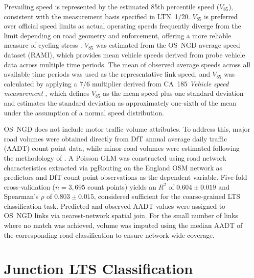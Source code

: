 Prevailing speed is represented by the estimated 85th percentile speed ($V_{85}$), consistent with the measurement basis specified in LTN~1/20. $V_{85}$ is preferred over official speed limits as actual operating speeds frequently diverge from the limit depending on road geometry and enforcement, offering a more reliable measure of cycling stress \parencite{fitzpatrick2003, europeancommission2021, departmentfortransport2025b}. $V_{85}$ was estimated from the OS~NGD average speed dataset (RAMI), which provides mean vehicle speeds derived from probe vehicle data across multiple time periods. The mean of observed average speeds across all available time periods was used as the representative link speed, and $V_{85}$ was calculated by applying a 7/6 multiplier derived from CA~185 \textit{Vehicle speed measurement} \parencite{nationalhighways2019}, which defines $V_{85}$ as the mean speed plus one standard deviation and estimates the standard deviation as approximately one-sixth of the mean under the assumption of a normal speed distribution.

OS~NGD does not include motor traffic volume attributes. To address this, major road volumes were obtained directly from DfT annual average daily traffic (AADT) count point data, while minor road volumes were estimated following the methodology of \parencite{morley2016}. A Poisson GLM was constructed using road network characteristics extracted via pgRouting on the England OSM network as predictors and DfT count point observations as the dependent variable. Five-fold cross-validation ($n = 3{,}695$ count points) yields an $R^2$ of $0.604 \pm 0.019$ and Spearman's $\rho$ of $0.803 \pm 0.015$, considered sufficient for the coarse-grained LTS classification task. Predicted and observed AADT values were assigned to OS~NGD links via nearest-network spatial join. For the small number of links where no match was achieved, volume was imputed using the median AADT of the corresponding road classification to ensure network-wide coverage.

\section{Junction LTS Classification}
\label{sec:method-junctionlts}

